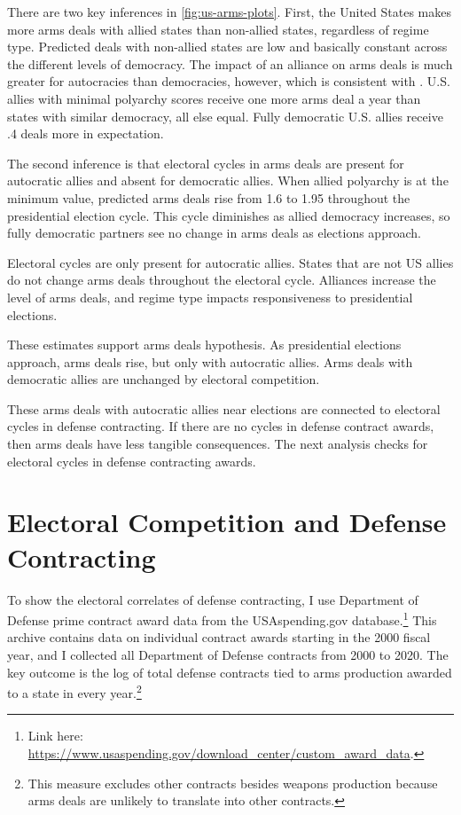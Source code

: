 \documentclass[12pt]{article}
\begin{document}
There are two key inferences in \autoref{fig:us-arms-plots}.
First, the United States makes more arms deals with allied states than non-allied states, regardless of regime type. 
Predicted deals with non-allied states are low and basically constant across the different levels of democracy. 
The impact of an alliance on arms deals is much greater for autocracies than democracies, however, which is consistent with \citep{McManusYarhi-Milo2017}. 
U.S. allies with minimal polyarchy scores receive one more arms deal a year than states with similar democracy, all else equal. 
Fully democratic U.S. allies receive .4 deals more in expectation. 


The second inference is that electoral cycles in arms deals are present for autocratic allies and absent for democratic allies.
When allied polyarchy is at the minimum value, predicted arms deals rise from 1.6 to 1.95 throughout the presidential election cycle.
This cycle diminishes as allied democracy increases, so fully democratic partners see no change in arms deals as elections approach.  


Electoral cycles are only present for autocratic allies. 
States that are not US allies do not change arms deals throughout the electoral cycle. 
Alliances increase the level of arms deals, and regime type impacts responsiveness to presidential elections. 


These estimates support arms deals hypothesis. 
As presidential elections approach, arms deals rise, but only with autocratic allies. 
Arms deals with democratic allies are unchanged by electoral competition.


These arms deals with autocratic allies near elections are connected to electoral cycles in defense contracting. 
If there are no cycles in defense contract awards, then arms deals have less tangible consequences. 
The next analysis checks for electoral cycles in defense contracting awards. 



\section{Electoral Competition and Defense Contracting}


To show the electoral correlates of defense contracting, I use Department of Defense prime contract award data from the USAspending.gov database.\footnote{Link here: \url{https://www.usaspending.gov/download_center/custom_award_data}.} 
This archive contains data on individual contract awards starting in the 2000 fiscal year, and I collected all Department of Defense contracts from 2000 to 2020.
The key outcome is the log of total defense contracts tied to arms production awarded to a state in every year.\footnote{This measure excludes other contracts besides weapons production because arms deals are unlikely to translate into other contracts.}
\end{document}
